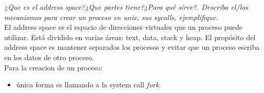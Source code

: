 \documentclass[../main.tex]{subfiles}
\begin{document}
    \begin{exercise}
        \textit{¿Que es el address space?¿Que partes tiene?¿Para qué sirve?. Describa el/los mecanismos para crear un proceso en unix, sus sycalls, ejemplifique.}\\

        El address space es el espacio de direcciones virtuales que un proceso puede utilizar.  Está dividido en varias áreas: text, data, stack y heap.
        El propósito del address space es mantener separados los procesos y evitar que un proceso escriba en los datos de otro proceso.\\
        
        Para la creacion de un proceso:
        \begin{itemize}
            \item única forma es llamando a la system call \textit{fork}.
        \end{itemize}
    \end{exercise}
\end{document}
